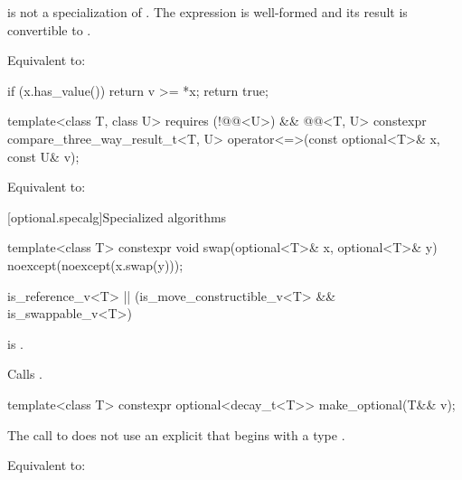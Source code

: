 \begin{itemdescr}
\pnum
\constraints
{} is not a specialization of .
The expression  is well-formed and
its result is convertible to .

\pnum
\effects
Equivalent to:
\begin{codeblock}
if (x.has_value())
  return v >= *x;
return true;
\end{codeblock}
\end{itemdescr}

%
\begin{itemdecl}
template<class T, class U>
  requires (!@@<U>) && @@<T, U>
  constexpr compare_three_way_result_t<T, U>
    operator<=>(const optional<T>& x, const U& v);
\end{itemdecl}

\begin{itemdescr}
\pnum
\effects
Equivalent to: 
\end{itemdescr}

[optional.specalg]{Specialized algorithms}

%
\begin{itemdecl}
template<class T>
  constexpr void swap(optional<T>& x, optional<T>& y) noexcept(noexcept(x.swap(y)));
\end{itemdecl}

\begin{itemdescr}
\pnum
\constraints
\begin{codeblock}
is_reference_v<T> || (is_move_constructible_v<T> && is_swappable_v<T>)
\end{codeblock}
is .

\pnum
\effects
Calls .
\end{itemdescr}

%
\begin{itemdecl}
template<class T> constexpr optional<decay_t<T>> make_optional(T&& v);
\end{itemdecl}

\begin{itemdescr}
\pnum
\constraints
The call to  does not use
an explicit  that
begins with a type .

\pnum
\effects
Equivalent to: 
\end{itemdescr}

